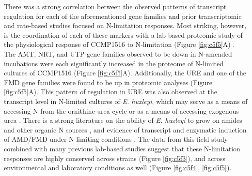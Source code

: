 There was a strong correlation between the observed patterns of transcript regulation for each of the aforementioned gene families and prior transcriptomic \citep{Rokitta2014} and rate-based \citep{Palenik1997, Bruhn2010} studies focused on N-limitation responses. Most striking, however, is the coordination of each of these markers with a lab-based proteomic study of the physiological response of CCMP1516 to N-limitation (Figure \ref{fig:c5f5}A) \citep{McKew2015}. The AMT, NRT, and UTP gene families observed to be down in N-amended incubations were each significantly increased in the proteome of N-limited cultures of CCMP1516 (Figure \ref{fig:c5f5}A).  Additionally, the URE and one of the FMD gene families were found to be up in proteomic analyses (Figure \ref{fig:c5f5}A). This pattern of regulation in URE was also observed at the transcript level in N-limited cultures of \textit{E. huxleyi}, which may serve as a means of accessing N from the ornithine-urea cycle \citep{Rokitta2015} or as a means of accessing exogenous urea \citep{Dyhrman2003a}. There is a strong literature on the ability of \textit{E. huxleyi} to grow on amides and other organic N sources \citep{Palenik1997}, and evidence of transcript and enzymatic induction of AMD/FMD under N-limiting conditions \citep{Bruhn2010, Palenik1997}. The data from this field study combined with many previous lab-based studies suggest that these N-limitation responses are highly conserved across strains (Figure \ref{fig:c5f3}), and across environmental and laboratory conditions as well (Figure \ref{fig:c5f4}, \ref{fig:c5f5}).\par


